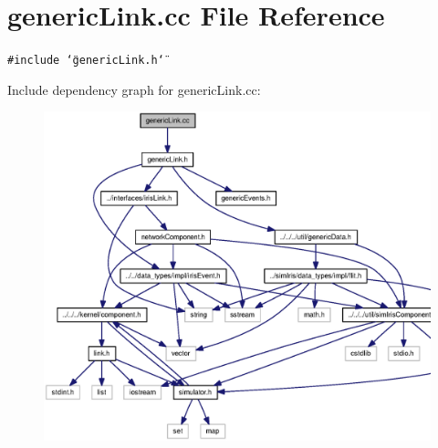 \section{genericLink.cc File Reference}
\label{genericLink_8cc}
{\tt \#include \char`\"{}genericLink.h\char`\"{}}\par


Include dependency graph for genericLink.cc:\nopagebreak
\begin{figure}[H]
\begin{center}
\leavevmode
\includegraphics[width=339pt]{genericLink_8cc__incl}
\end{center}
\end{figure}
